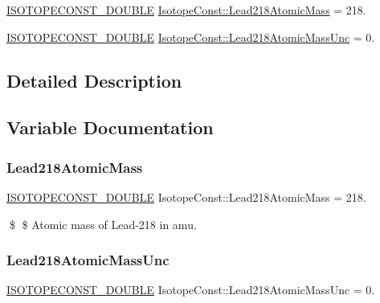\begin{DoxyCompactItemize}
\item 
\mbox{\hyperlink{group___isotope_const-_macros_ga8f45a7272ce02c0b4c65c44636ed719a}{I\+S\+O\+T\+O\+P\+E\+C\+O\+N\+S\+T\+\_\+\+D\+O\+U\+B\+LE}} \mbox{\hyperlink{group___isotope_const-_lead-_pb218_ga9e0bd5e79be10cfebf75a3684e7ecccc}{Isotope\+Const\+::\+Lead218\+Atomic\+Mass}} = 218.
\item 
\mbox{\hyperlink{group___isotope_const-_macros_ga8f45a7272ce02c0b4c65c44636ed719a}{I\+S\+O\+T\+O\+P\+E\+C\+O\+N\+S\+T\+\_\+\+D\+O\+U\+B\+LE}} \mbox{\hyperlink{group___isotope_const-_lead-_pb218_ga3df64a017c0d33653111fed341f9e386}{Isotope\+Const\+::\+Lead218\+Atomic\+Mass\+Unc}} = 0.
\end{DoxyCompactItemize}


\subsection{Detailed Description}


\subsection{Variable Documentation}
\mbox{\label{group___isotope_const-_lead-_pb218_ga9e0bd5e79be10cfebf75a3684e7ecccc}} 
\subsubsection{\texorpdfstring{Lead218\+Atomic\+Mass}{Lead218AtomicMass}}
{\footnotesize\ttfamily \mbox{\hyperlink{group___isotope_const-_macros_ga8f45a7272ce02c0b4c65c44636ed719a}{I\+S\+O\+T\+O\+P\+E\+C\+O\+N\+S\+T\+\_\+\+D\+O\+U\+B\+LE}} Isotope\+Const\+::\+Lead218\+Atomic\+Mass = 218.}

\$ \$ Atomic mass of Lead-\/218 in amu. \mbox{\label{group___isotope_const-_lead-_pb218_ga3df64a017c0d33653111fed341f9e386}} 
\subsubsection{\texorpdfstring{Lead218\+Atomic\+Mass\+Unc}{Lead218AtomicMassUnc}}
{\footnotesize\ttfamily \mbox{\hyperlink{group___isotope_const-_macros_ga8f45a7272ce02c0b4c65c44636ed719a}{I\+S\+O\+T\+O\+P\+E\+C\+O\+N\+S\+T\+\_\+\+D\+O\+U\+B\+LE}} Isotope\+Const\+::\+Lead218\+Atomic\+Mass\+Unc = 0.}

